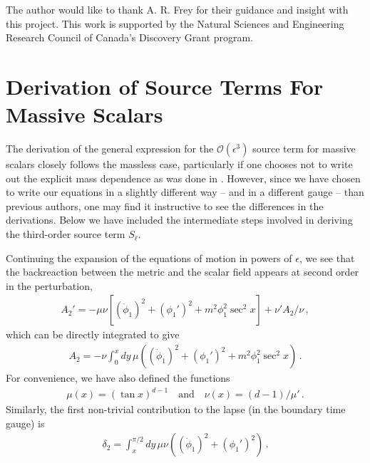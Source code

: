 \documentclass[letterpaper,11pt]{article}
\newcommand{\mc}{\mathcal}
\begin{document}

\acknowledgments The author would like to thank A. R. Frey for their guidance and insight with this project. This work is supported by the Natural Sciences and Engineering Research Council of Canada's Discovery Grant program.


\appendix
\section{Derivation of Source Terms For Massive Scalars}
\label{app: source term derivation}

The derivation of the general expression for the $\mc{O}(\epsilon^3)$ source term for massive scalars closely follows the massless case, particularly if one chooses not to write out the explicit mass dependence as was done in \cite{1810.04753}. However, since we have chosen to write our equations in a slightly different way -- and in a different gauge -- than previous authors, one may find it instructive to see the differences in the derivations. Below we have included the intermediate steps involved in deriving the third-order source term $S_\ell$.

Continuing the expansion of the equations of motion in powers of $\epsilon$, we see that the backreaction between the metric and the scalar field appears at second order in the perturbation,
\begin{align}
A_2' = - \mu \nu \left[ (\dot \phi_1 )^2 + (\phi_1')^2 + m^2 \phi_1^2 \sec^2 x \right] + \nu' A_2 / \nu \, ,
\end{align}
which can be directly integrated to give
\begin{align}
A_2 = -\nu \int^x_0 dy \, \mu \left( (\dot \phi_1 )^2 + (\phi_1')^2 + m^2 \phi_1^2 \sec^2 x \right) \, .
\end{align}
For convenience, we have also defined the functions
\begin{align}
\mu (x) = \left( \tan x \right)^{d-1} \quad \text{and} \quad \nu(x) = (d-1) / \mu ' \, .
\end{align}
Similarly, the first non-trivial contribution to the lapse (in the boundary time gauge) is
\begin{align}
\delta_2 = \int^{\pi/2}_x dy \, \mu \nu \left(  (\dot \phi_1 )^2 + (\phi_1')^2 \right) \, .
\end{align}
\end{document}
